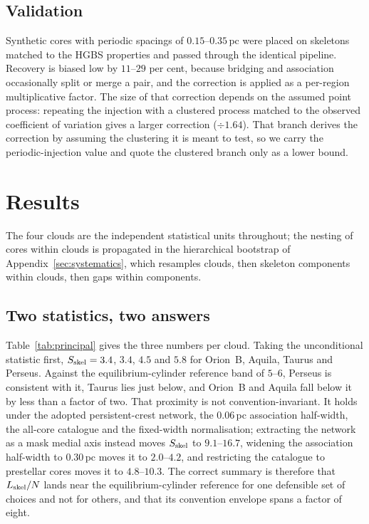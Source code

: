 \documentclass[usenatbib,twoside,twocolumn]{mnras}
\begin{document}
\subsection{Validation}
\label{sec:injection_recovery}

Synthetic cores with periodic spacings of $0.15$--$0.35$\,pc were placed on skeletons matched to the HGBS properties and passed through the identical pipeline. Recovery is biased low by $11$--$29$ per cent, because bridging and association occasionally split or merge a pair, and the correction is applied as a per-region multiplicative factor. The size of that correction depends on the assumed point process: repeating the injection with a clustered process matched to the observed coefficient of variation gives a larger correction ($\div1.64$). That branch derives the correction by assuming the clustering it is meant to test, so we carry the periodic-injection value and quote the clustered branch only as a lower bound.

\section{Results}
\label{sec:results}

The four clouds are the independent statistical units throughout; the nesting of cores within clouds is propagated in the hierarchical bootstrap of Appendix~\ref{sec:systematics}, which resamples clouds, then skeleton components within clouds, then gaps within components.

\subsection{Two statistics, two answers}
\label{sec:twostats}

Table~\ref{tab:principal} gives the three numbers per cloud. Taking the unconditional statistic first, $S_{\rm skel}=3.4$, $3.4$, $4.5$ and $5.8$ for Orion~B, Aquila, Taurus and Perseus. Against the equilibrium-cylinder reference band of $5$--$6$, Perseus is consistent with it, Taurus lies just below, and Orion~B and Aquila fall below it by less than a factor of two. That proximity is not convention-invariant. It holds under the adopted persistent-crest network, the $0.06$\,pc association half-width, the all-core catalogue and the fixed-width normalisation; extracting the network as a mask medial axis instead moves $S_{\rm skel}$ to $9.1$--$16.7$, widening the association half-width to $0.30$\,pc moves it to $2.0$--$4.2$, and restricting the catalogue to prestellar cores moves it to $4.8$--$10.3$. The correct summary is therefore that $L_{\rm skel}/N$ lands near the equilibrium-cylinder reference for one defensible set of choices and not for others, and that its convention envelope spans a factor of eight.
\end{document}
